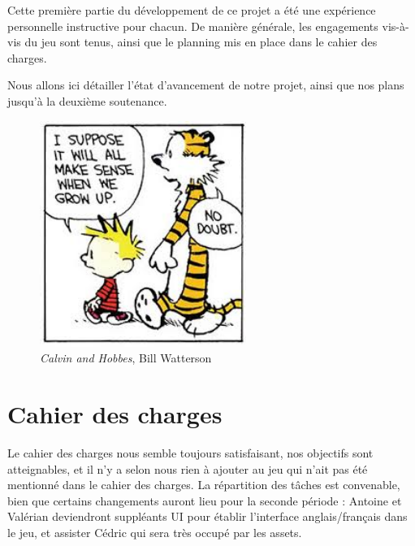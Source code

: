 \documentclass[12pt]{report}
\begin{document}
Cette première partie du développement de ce projet a été une expérience personnelle instructive pour chacun. De manière générale, les engagements vis-à-vis du jeu sont tenus, ainsi que le planning mis en place dans le cahier des charges.

Nous allons ici détailler l'état d'avancement de notre projet, ainsi que nos plans jusqu'à la deuxième soutenance.

\begin{figure}
    \centering
    \includegraphics[width=0.6\textwidth]{project_mood_S1}
    \caption*{\textit{Calvin and Hobbes}, Bill Watterson}
\end{figure}

\chapter{Cahier des charges}

Le cahier des charges nous semble toujours satisfaisant, nos objectifs sont atteignables, et il n'y a selon nous rien à ajouter au jeu qui n'ait pas été mentionné dans le cahier des charges. La répartition des tâches est convenable, bien que certains changements auront lieu pour la seconde période : Antoine et Valérian deviendront suppléants UI pour établir l'interface anglais/français dans le jeu, et assister Cédric qui sera très occupé par les assets.
\end{document}
